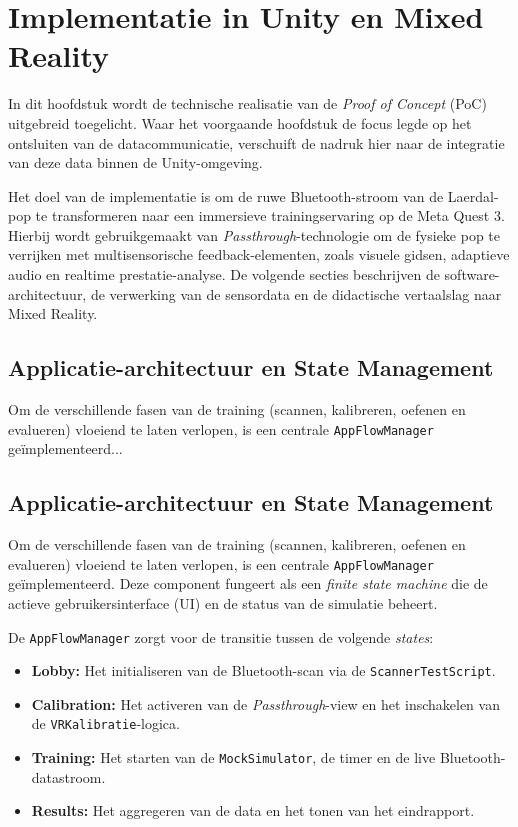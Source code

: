 \chapter{Implementatie in Unity en Mixed Reality}
\label{ch:implementatie}

In dit hoofdstuk wordt de technische realisatie van de \textit{Proof of Concept} (PoC) uitgebreid toegelicht. 
Waar het voorgaande hoofdstuk de focus legde op het ontsluiten van de datacommunicatie, verschuift de nadruk hier 
naar de integratie van deze data binnen de Unity-omgeving. 

Het doel van de implementatie is om de ruwe Bluetooth-stroom van de Laerdal-pop te transformeren naar een immersieve 
trainingservaring op de Meta Quest 3. Hierbij wordt gebruikgemaakt van \textit{Passthrough}-technologie om de fysieke pop 
te verrijken met multisensorische feedback-elementen, zoals visuele gidsen, adaptieve audio en realtime prestatie-analyse. 
De volgende secties beschrijven de software-architectuur, de verwerking van de sensordata en de didactische vertaalslag naar 
Mixed Reality.

\section{Applicatie-architectuur en State Management}
Om de verschillende fasen van de training (scannen, kalibreren, oefenen en evalueren) vloeiend te laten verlopen, is een centrale \texttt{AppFlowManager} geïmplementeerd...

\section{Applicatie-architectuur en State Management}
Om de verschillende fasen van de training (scannen, kalibreren, oefenen en evalueren) vloeiend te laten verlopen, is een centrale \texttt{AppFlowManager} geïmplementeerd. 
Deze component fungeert als een \textit{finite state machine} die de actieve gebruikersinterface (UI) en de status van de simulatie beheert.

De \texttt{AppFlowManager} zorgt voor de transitie tussen de volgende \textit{states}:
\begin{itemize}
    \item \textbf{Lobby:} Het initialiseren van de Bluetooth-scan via de \texttt{ScannerTestScript}.
    \item \textbf{Calibration:} Het activeren van de \textit{Passthrough}-view en het inschakelen van de \texttt{VRKalibratie}-logica.
    \item \textbf{Training:} Het starten van de \texttt{MockSimulator}, de timer en de live Bluetooth-datastroom.
    \item \textbf{Results:} Het aggregeren van de data en het tonen van het eindrapport.
\end{itemize}

